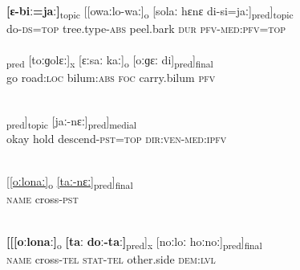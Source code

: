\documentclass[output=paper]{LSP/langsci}
\begin{document}
\begin{exe}

\ex \label{Aiex:App29ab}
\begin{xlist}
\ex \label{Aiex:App29a}
\gll \textbf{[ɛ-biː=jaː]}\textsubscript{topic}	[[owaːlo-waː]\textsubscript{o}	[solaː	hɛnɛ	di-si=jaː]\textsubscript{pred}]\textsubscript{topic}\\
do-\textsc{ds}=\textsc{top}	tree.type-\textsc{abs}	peel.bark	\textsc{dur}	\textsc{pfv}-\textsc{med}:\textsc{pfv}=\textsc{top}\\
\glt {}\\
\ex \label{Aiex:App29b}
\gll [[hɛnaː]\textsubscript{pred}	[toːɡolɛː]\textsubscript{x}	[ɛːsaː	kaː]\textsubscript{o}	[oːɡɛː	di]\textsubscript{pred}]\textsubscript{final}\\
go	road:\textsc{loc}	bilum:\textsc{abs}	\textsc{foc}	carry.bilum	\textsc{pfv}\\
\glt {}\\
\end{xlist}
\end{exe}

\begin{exe}
\ex \label{Aiex:App30}
\gll [[\textit{[oːkɛ]}\textsubscript{x}	[dijaː	ti-nɛː=jaː]\textsubscript{pred}]\textsubscript{topic}	[jaː-nɛː]\textsubscript{pred}]\textsubscript{medial}\\
okay	hold	descend-\textsc{pst}=\textsc{top}	\textsc{dir:ven}-\textsc{med}:\textsc{ipfv}\\
\glt {}\\
\end{exe}

\begin{exe}
\ex \label{Aiex:App31}
\gll \underline{[[oːlonaː]}\textsubscript{o}	\underline{[taː-nɛː]}\textsubscript{pred}]\textsubscript{final}\\
\textsc{name}	cross-\textsc{pst}\\
‎‎\glt {}\\
\end{exe}

\begin{exe}
\ex \label{Aiex:App32}
\gll \textbf{[[[oːlonaː]}\textsubscript{o}	\textbf{[taː}	\textbf{doː-taː]}\textsubscript{pred}]\textsubscript{x}	[noːloː	hoːnoː]\textsubscript{pred}]\textsubscript{final}\\
\textsc{name}	cross-\textsc{tel}	\textsc{stat}-\textsc{tel}	other.side	\textsc{dem}:\textsc{lvl}\\
\glt {}\\
\end{exe}
\end{document}
